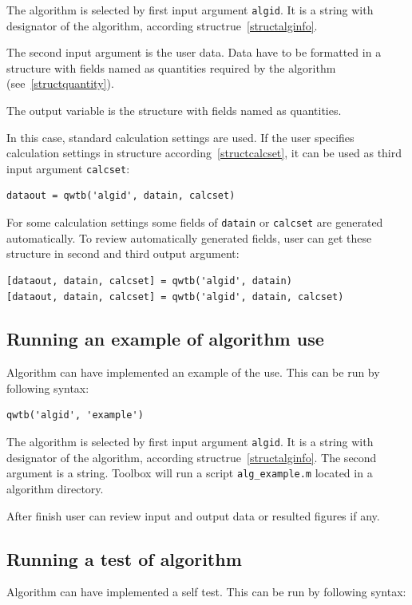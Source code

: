 \documentclass[12pt,a4paper,oneside]{report} %
\begin{document}
The algorithm is selected by first input argument \lstinline{algid}. It is a string with
designator of the algorithm, according structrue~\ref{structalginfo}.

The second input argument is the user data. Data have to be formatted in a structure with fields
named as quantities required by the algorithm (see~\ref{structquantity}).

The output variable is the structure with fields named as quantities.

In this case, standard calculation settings are used. If the user specifies calculation settings
in structure according~\ref{structcalcset}, it can be used as third input argument
\lstinline{calcset}:

\begin{lstlisting}
dataout = qwtb('algid', datain, calcset)
\end{lstlisting}

For some calculation settings some fields of \lstinline{datain} or \lstinline{calcset} are generated
automatically. To review automatically generated fields, user can get these structure in second and
third output argument:

\begin{lstlisting}
[dataout, datain, calcset] = qwtb('algid', datain)
[dataout, datain, calcset] = qwtb('algid', datain, calcset)
\end{lstlisting}

\subsection{Running an example of algorithm use} %
Algorithm can have implemented an example of the use. This can be run by following syntax:

\begin{lstlisting}
qwtb('algid', 'example')
\end{lstlisting}

The algorithm is selected by first input argument \lstinline{algid}. It is a string with
designator of the algorithm, according structrue~\ref{structalginfo}. The second argument is a
string. Toolbox will run a script \lstinline{alg_example.m} located in a algorithm directory.

After finish user can review input and output data or resulted figures if any.

\subsection{Running a test of algorithm} %
Algorithm can have implemented a self test. This can be run by following syntax:
\end{document}
